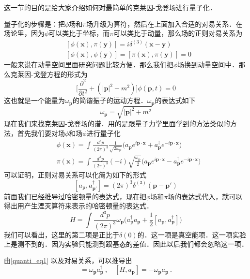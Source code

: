 这一节的目的是给大家介绍如何对最简单的克莱因-戈登场进行量子化．

量子化的步骤是：把$\phi$场和$\pi$场升级为算符，然后在上面加入合适的对易关系．在场论里，因为$\phi$可以类比于坐标，而$\pi$可以类比于动量，那么场的正则对易关系为
\begin{equation}
\begin{aligned}
& [\phi(\mathbf x),\pi(\mathbf y)] = i \delta^{(3)}(\mathbf x- \mathbf y) \\
& [\phi(\mathbf x),\phi(\mathbf y)]  = [\pi(\mathbf x),\pi(\mathbf y)] = 0
\end{aligned}
\end{equation}
一般来说在动量空间里面研究问题比较方便．那么我们把$\phi$场换到动量空间中．那么克莱因-戈登方程的形式为
\begin{equation}
\bigg[\frac{\partial^2}{\partial t^2}+(|\mathbf p|^2+m^2)\bigg] \phi(\mathbf p, t) = 0
\end{equation}
这也就是一个能量为$\omega_{\mathbf p}$的简谐振子的运动方程．$\omega_{\mathbf p}$的表达式如下
\begin{equation}
\omega_{\mathbf p} = \sqrt{|\mathbf p|^2+m^2}
\end{equation}
现在我们来找克莱因-戈登场的谱．用的是跟量子力学里面学到的方法类似的方法，首先我们要对场$\phi$和场$\phi$进行量子化
\begin{equation}\label{quanti_eq3}
\begin{aligned}
& \phi(\mathbf x) = \int \frac{d^3p}{(2\pi)^3} \frac{1}{\sqrt{2\omega_{\mathbf p}}}\bigg( a_{\mathbf p} e^{i \mathbf p \cdot \mathbf x} + a_{\mathbf p}^\dagger e^{-i\mathbf p \cdot \mathbf x} \bigg) \\
& \pi(\mathbf x) = \int \frac{d^3p}{(2\pi)^3} (-i) \sqrt{\frac{\omega_{\mathbf p}}{2}} \bigg( a_{\mathbf p} e^{i \mathbf p \cdot \mathbf x} - a^{\dagger}_{\mathbf p} e^{-i \mathbf p \cdot \mathbf x} \bigg)
\end{aligned}
\end{equation}
可以证明，正则对易关系可以化简为如下的形式
\begin{equation}\label{quanti_eq2}
[a_{\mathbf p},a_{\mathbf p'}^\dagger] = (2\pi)^3 \delta^{(3)} (\mathbf p - \mathbf p')
\end{equation}
前面我们已经推导过哈密顿量的表达式，现在把$\phi$场和$\pi$场的表达式代入，就可以得出用产生湮灭算符来表示的哈密顿量的表达式．
\begin{equation}\label{quanti_eq1}
H = \int \frac{d^3p}{(2\pi)^3} \omega_{\mathbf p} \bigg(  a^\dagger_{\mathbf p} a_{\mathbf p} + \frac{1}{2} [a_{\mathbf p},a^\dagger_{\mathbf p}] \bigg)
\end{equation}
我们可以看出，这里的第二项是正比于$\delta(0)$的．这一项是真空能项．这一项实验上是测不到的．因为实验只能测到跟基态的差值．因此以后我们都会忽略这一项．

由\autoref{quanti_eq1} 以及对易关系，可以推导出
\begin{equation}
[H,a_{\mathbf p}^\dagger] = \omega_{\mathbf p} a^\dagger_{\mathbf p}~, \quad [H,a_{\mathbf p}] = -\omega_{\mathbf p} a_{\mathbf p}~.
\end{equation}




